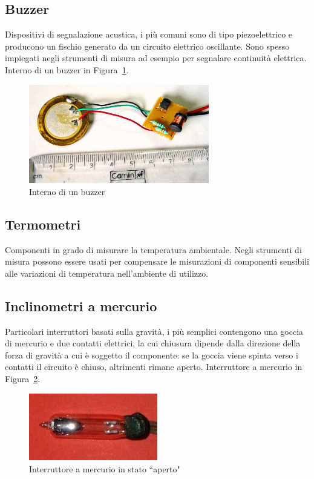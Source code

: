 \documentclass[12pt,a4paper]{report}
\begin{document}
\subsection{Buzzer}
Dispositivi di segnalazione acustica, i più comuni sono di tipo piezoelettrico e producono un fischio generato da un circuito elettrico oscillante.
Sono spesso impiegati negli strumenti di misura ad esempio per segnalare continuità elettrica.
Interno di un buzzer in Figura~\ref{fig:internobuzzer}.

\begin{figure}[h]
  \centering
  \includegraphics[width=0.7\textwidth]{internobuzzer}
  \caption{Interno di un buzzer \cite{wiki:internobuzzer}}
  \label{fig:internobuzzer}
\end{figure}

\subsection{Termometri}
Componenti in grado di misurare la temperatura ambientale. Negli strumenti di misura possono essere usati per compensare le misurazioni
di componenti sensibili alle variazioni di temperatura nell'ambiente di utilizzo.
\subsection{Inclinometri a mercurio}
Particolari interruttori basati sulla gravità, i più semplici contengono una goccia di mercurio e due contatti elettrici, la cui chiusura dipende dalla
direzione della forza di gravità a cui è soggetto il componente: se la goccia viene spinta verso i contatti il circuito è chiuso, altrimenti rimane aperto.
Interruttore a mercurio in Figura~\ref{fig:mercuryswitch}.

\begin{figure}[h]
  \centering
  \includegraphics[width=0.5\textwidth]{mercuryswitch}
  \caption{Interruttore a mercurio in stato ``aperto" \cite{wiki:mercuryswitch}}
  \label{fig:mercuryswitch}
\end{figure}
\end{document}
